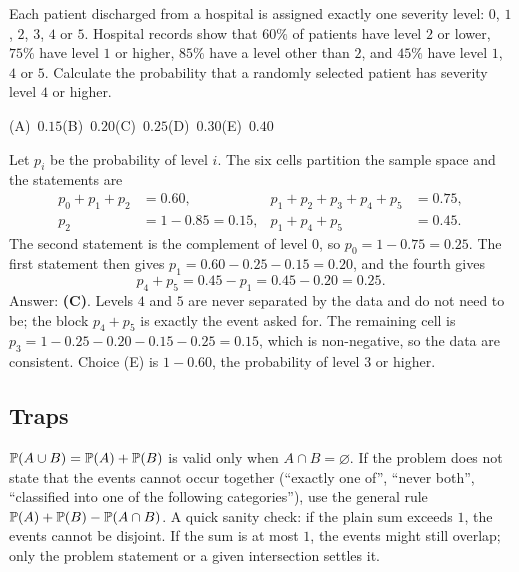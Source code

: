 \begin{example}
Each patient discharged from a hospital is assigned exactly one severity level: $0$, $1$,
$2$, $3$, $4$ or $5$. Hospital records show that
$60\%$ of patients have level $2$ or lower,
$75\%$ have level $1$ or higher,
$85\%$ have a level other than $2$, and
$45\%$ have level $1$, $4$ or $5$.
Calculate the probability that a randomly selected patient has severity level $4$ or
higher.

\smallskip\noindent (A)~$0.15$\hfill (B)~$0.20$\hfill (C)~$0.25$\hfill (D)~$0.30$\hfill (E)~$0.40$\hfill\mbox{}
\end{example}
\begin{solution}
Let $p_i$ be the probability of level $i$. The six cells partition the sample space and the
statements are
\begin{align*}
p_0 + p_1 + p_2 &= 0.60, & p_1 + p_2 + p_3 + p_4 + p_5 &= 0.75, \\
p_2 &= 1 - 0.85 = 0.15, & p_1 + p_4 + p_5 &= 0.45.
\end{align*}
The second statement is the complement of level $0$, so $p_0 = 1 - 0.75 = 0.25$. The
first statement then gives $p_1 = 0.60 - 0.25 - 0.15 = 0.20$, and the fourth gives
\[
p_4 + p_5 = 0.45 - p_1 = 0.45 - 0.20 = 0.25.
\]
Answer: \textbf{(C)}. Levels $4$ and $5$ are never separated by the data and do not need to
be; the block $p_4 + p_5$ is exactly the event asked for. The remaining cell is
$p_3 = 1 - 0.25 - 0.20 - 0.15 - 0.25 = 0.15$, which is non-negative, so the data are
consistent. Choice (E) is $1 - 0.60$, the probability of level $3$ or higher.
\end{solution}

\subsection{Traps}

\begin{trap}
$\mathbb{P}(A \cup B) = \mathbb{P}(A) + \mathbb{P}(B)$ is valid only when $A \cap B = \varnothing$. If the
problem does not state that the events cannot occur together (``exactly one of'', ``never
both'', ``classified into one of the following categories''), use the general rule
$\mathbb{P}(A) + \mathbb{P}(B) - \mathbb{P}(A \cap B)$. A quick sanity check: if the plain sum exceeds $1$,
the events cannot be disjoint. If the sum is at most $1$, the events might still overlap;
only the problem statement or a given intersection settles it.
\end{trap}

